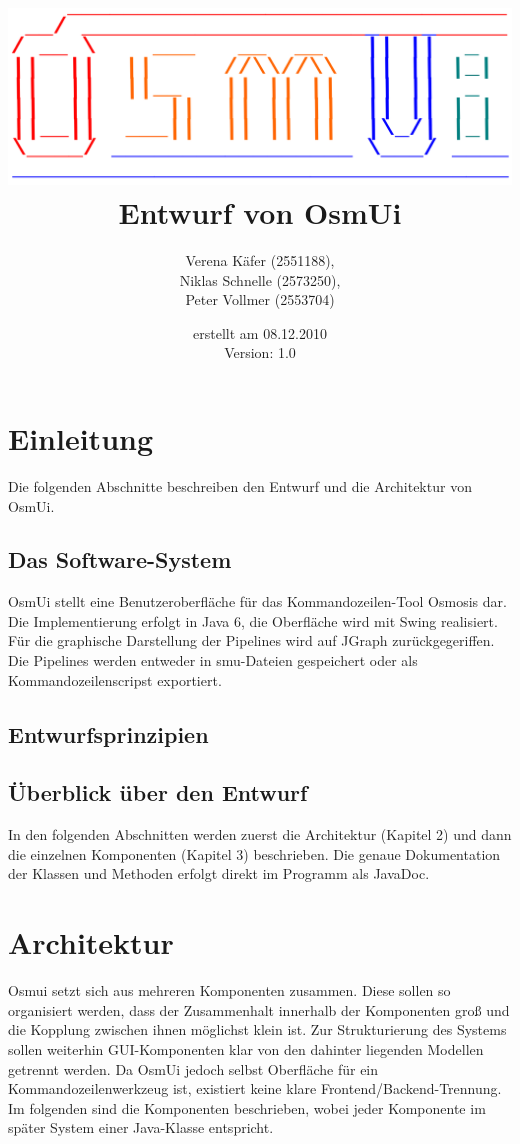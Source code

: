 \documentclass[a4paper,12pt]{scrartcl}
\author{
Verena Käfer (2551188),\\
Niklas Schnelle (2573250),\\
Peter Vollmer (2553704)}
\date{erstellt am 08.12.2010\\
Version: 1.0}
\title{\includegraphics[width=15cm]{../projektplan/Logo_Osmui.png} \\ 
Entwurf von OsmUi}
\begin{document}
\maketitle
\newpage
\tableofcontents
\newpage

\section{Einleitung}
Die folgenden Abschnitte beschreiben den Entwurf und die Architektur von OsmUi.
\subsection{Das Software-System}
OsmUi stellt eine Benutzeroberfläche für das Kommandozeilen-Tool Osmosis dar. Die Implementierung erfolgt in Java 6, die Oberfläche wird mit Swing realisiert. Für die graphische Darstellung der Pipelines wird auf JGraph zurückgegeriffen. Die Pipelines werden entweder in smu-Dateien gespeichert oder als Kommandozeilenscripst exportiert.
\subsection{Entwurfsprinzipien}

\subsection{Überblick über den Entwurf}
In den folgenden Abschnitten werden zuerst die Architektur (Kapitel 2) und dann die einzelnen Komponenten (Kapitel 3) beschrieben. Die genaue Dokumentation der Klassen und Methoden erfolgt direkt im Programm als JavaDoc.

\section{Architektur}
Osmui setzt sich aus mehreren Komponenten zusammen. Diese sollen so organisiert werden, dass der Zusammenhalt innerhalb der Komponenten groß und die Kopplung zwischen ihnen möglichst klein ist. Zur Strukturierung des Systems sollen weiterhin GUI-Komponenten klar von den dahinter liegenden Modellen getrennt werden. Da OsmUi jedoch selbst Oberfläche für ein Kommandozeilenwerkzeug ist, existiert keine klare Frontend/Backend-Trennung.\\
Im folgenden sind die Komponenten beschrieben, wobei jeder Komponente im später System einer Java-Klasse entspricht.

\end{document}
